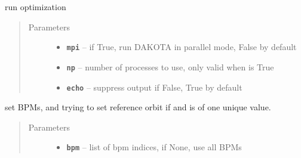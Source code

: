 \documentclass[letterpaper,10pt,english]{sphinxmanual}
\begin{document}
\begin{fulllineitems}

\begin{fulllineitems}
\label{src/apidocs/genopt:genopt.DakotaOC.ref_flag}
\end{fulllineitems}


\begin{fulllineitems}
\label{src/apidocs/genopt:genopt.DakotaOC.ref_x0}
\end{fulllineitems}


\begin{fulllineitems}
\label{src/apidocs/genopt:genopt.DakotaOC.ref_y0}
\end{fulllineitems}


\begin{fulllineitems}
\label{src/apidocs/genopt:genopt.DakotaOC.run}
run optimization
\begin{quote}\begin{description}
\item[{Parameters}] \leavevmode\begin{itemize}
\item {} 
\textbf{\texttt{mpi}} -- if True, run DAKOTA in parallel mode, False by default

\item {} 
\textbf{\texttt{np}} -- number of processes to use, only valid when  is True

\item {} 
\textbf{\texttt{echo}} -- suppress output if False, True by default

\end{itemize}

\end{description}\end{quote}

\end{fulllineitems}


\begin{fulllineitems}
\label{src/apidocs/genopt:genopt.DakotaOC.set_bpms}
set BPMs, and trying to set reference orbit  if  and 
is of one unique value.
\begin{quote}\begin{description}
\item[{Parameters}] \leavevmode\begin{itemize}
\item {} 
\textbf{\texttt{bpm}} -- list of bpm indices, if None, use all BPMs


\end{itemize}
\end{description}
\end{quote}
\end{fulllineitems}
\end{fulllineitems}
\end{document}
